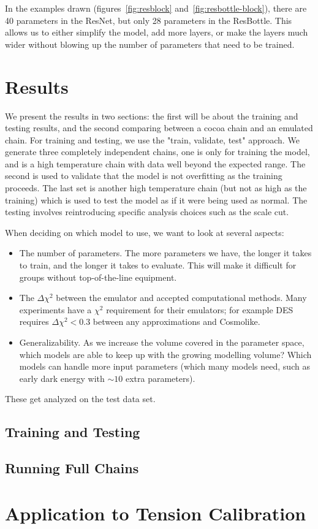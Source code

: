 In the examples drawn (figures~\ref{fig:resblock} and~\ref{fig:resbottle-block}), there are 40 parameters in the ResNet, but only 28 parameters in the ResBottle. This allows us to either simplify the model, add more layers, or make the layers much wider without blowing up the number of parameters that need to be trained.
\section{Results}
We present the results in two sections: the first will be about the training and testing results, and the second comparing between a cocoa chain and an emulated chain. For training and testing, we use the "train, validate, test" approach. We generate three completely independent chains, one is only for training the model, and is a high temperature chain with data well beyond the expected range. The second is used to validate that the model is not overfitting as the training proceeds. The last set is another high temperature chain (but not as high as the training) which is used to test the model as if it were being used as normal. The testing involves reintroducing specific analysis choices such as the scale cut.

When deciding on which model to use, we want to look at several aspects:
\begin{itemize}
	\item The number of parameters. The more parameters we have, the longer it takes to train, and the longer it takes to evaluate. This will make it difficult for groups without top-of-the-line equipment.
	\item The $\Delta\chi^2$ between the emulator and accepted computational methods. Many experiments have a $\chi^2$ requirement for their emulators; for example DES requires $\Delta\chi^2<0.3$ between any approximations and Cosmolike.
	\item Generalizability. As we increase the volume covered in the parameter space, which models are able to keep up with the growing modelling volume? Which models can handle more input parameters (which many models need, such as early dark energy with $\sim10$ extra parameters).
\end{itemize}
These get analyzed on the test data set.
\subsection{Training and Testing}
\subsection{Running Full Chains}
\section{Application to Tension Calibration}
